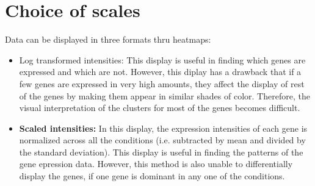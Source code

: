 \documentclass[12pt, oneside, letterpaper]{article}
\begin{document}
\section*{Choice of scales}
Data can be displayed in three formats thru heatmaps:







\begin{itemize}

\item {Log transformed intensities:} 
	This display is useful in finding which genes are expressed
	and which are not. However, this diplay has a drawback that
	if a few genes are expressed in very high amounts, they
	affect the display of rest of the genes by making them
	appear in similar shades of color.  Therefore, the visual
	interpretation of the clusters for most of the genes becomes
	difficult.

\item \textbf{Scaled intensities:} 
	In this display, the expression intensities of each gene is
	normalized across all the conditions (i.e. subtracted by
	mean and divided by the standard deviation). This display is
	useful in finding the patterns of the gene epression
	data. However, this method is also unable to differentially
	display the genes, if one gene is dominant in any one of the
	conditions.

\begin{figure}[p]


\end{figure}
\end{itemize}
\end{document}
